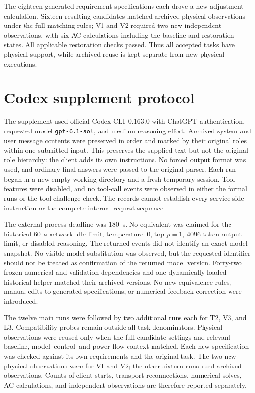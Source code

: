 The eighteen generated requirement specifications each drove a new adjustment calculation. Sixteen resulting candidates matched archived physical observations under the full matching rules; V1 and V2 required two new independent observations, with six AC calculations including the baseline and restoration states. All applicable restoration checks passed. Thus all accepted tasks have physical support, while archived reuse is kept separate from new physical executions.


\section{Codex supplement protocol}
\label{app:codex-protocol}

The supplement used official Codex CLI~0.163.0 with ChatGPT authentication, requested model \texttt{gpt-6.1-sol}, and medium reasoning effort. Archived system and user message contents were preserved in order and marked by their original roles within one submitted input. This preserves the supplied text but not the original role hierarchy: the client adds its own instructions. No forced output format was used, and ordinary final answers were passed to the original parser. Each run began in a new empty working directory and a fresh temporary session. Tool features were disabled, and no tool-call events were observed in either the formal runs or the tool-challenge check. The records cannot establish every service-side instruction or the complete internal request sequence.

The external process deadline was 180~s. No equivalent was claimed for the historical 60~s network-idle limit, temperature~0, top-$p=1$, 4096-token output limit, or disabled reasoning. The returned events did not identify an exact model snapshot. No visible model substitution was observed, but the requested identifier should not be treated as confirmation of the returned model version. Forty-two frozen numerical and validation dependencies and one dynamically loaded historical helper matched their archived versions. No new equivalence rules, manual edits to generated specifications, or numerical feedback correction were introduced.

The twelve main runs were followed by two additional runs each for T2, V3, and L3. Compatibility probes remain outside all task denominators. Physical observations were reused only when the full candidate settings and relevant baseline, model, control, and power-flow context matched. Each new specification was checked against its own requirements and the original task. The two new physical observations were for V1 and V2; the other sixteen runs used archived observations. Counts of client starts, transport reconnections, numerical solves, AC calculations, and independent observations are therefore reported separately.

